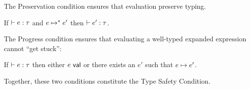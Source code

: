 The Preservation condition ensures that evaluation preserve typing.  

\begingroup
\def\thetheorem{\ref{condition:preservation-UP}}
\begin{condition}[Preservation] If $\vdash e : \tau$ and $e \mapsto^{*} e'$ then $\vdash e' : \tau$. \end{condition}
\endgroup
The Progress condition ensures that evaluating a well-typed expanded expression cannot ``get stuck'':
\begingroup
\def\thetheorem{\ref{condition:progress-UP}}
\begin{condition}[Progress] If $\vdash e : \tau$ then either $e~\mathsf{val}$ or there exists an $e'$ such that $e \mapsto e'$. \end{condition}
\endgroup
 Together, these two conditions constitute the Type Safety Condition.

\vspace{-5px}
